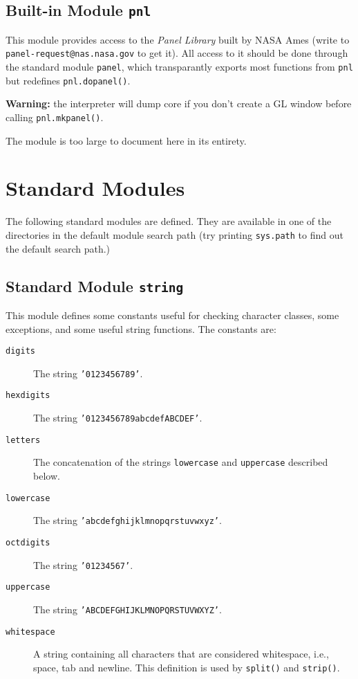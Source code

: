 \subsection{Built-in Module {\tt pnl}}

This module provides access to the
{\em Panel Library}
built by NASA Ames (write to
{\tt panel-request@nas.nasa.gov}
to get it).
All access to it should be done through the standard module
{\tt panel},
which transparantly exports most functions from
{\tt pnl}
but redefines
{\tt pnl.dopanel()}.

{\bf Warning:}
the {\Python} interpreter will dump core if you don't create a GL window
before calling
{\tt pnl.mkpanel()}.

The module is too large to document here in its entirety.

\section{Standard Modules}

The following standard modules are defined.
They are available in one of the directories in the default module
search path (try printing
{\tt sys.path}
to find out the default search path.)

\subsection{Standard Module {\tt string}}

This module defines some constants useful for checking character
classes, some exceptions, and some useful string functions.
The constants are:
\begin{description}
\item[{\tt digits}]
The string
{\tt '0123456789'}.
\item[{\tt hexdigits}]
The string
{\tt '0123456789abcdefABCDEF'}.
\item[{\tt letters}]
The concatenation of the strings
{\tt lowercase}
and
{\tt uppercase}
described below.
\item[{\tt lowercase}]
The string
{\tt 'abcdefghijklmnopqrstuvwxyz'}.
\item[{\tt octdigits}]
The string
{\tt '01234567'}.
\item[{\tt uppercase}]
The string
{\tt 'ABCDEFGHIJKLMNOPQRSTUVWXYZ'}.
\item[{\tt whitespace}]
A string containing all characters that are considered whitespace,
i.e.,
space, tab and newline.
This definition is used by
{\tt split()}
and
{\tt strip()}.
\end{description}


